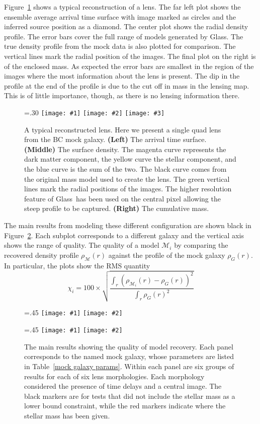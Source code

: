 \documentclass[onecolumn,galley]{mn2e}
\newcommand{\Glass}{{\sc Glass}}
\newcommand{\M}{\ensuremath{\mathscr{M}}}
\newcommand{\tabref}[1] {Table~\ref{#1}}
\newcommand{\figref}[1] {Figure~\ref{#1}}
\newcommand\plottwo[2]{{%
 \centering
 \leavevmode
 \columnwidth=.45\columnwidth
 \texttt{[image: \#1]}%
 \hfil
 \texttt{[image: \#2]}%
}}%
\newcommand\plotthree[3]{{%
 \centering
 \leavevmode
 \columnwidth=.30\columnwidth
 \texttt{[image: \#1]}%
 \hfil
 \texttt{[image: \#2]}%
 \hfil
 \texttt{[image: \#3]}%
}}%
\begin{document}
\figref{reconstruction} shows a typical reconstruction of a
lens. The far left plot shows the ensemble average arrival time surface with
image marked as circles and the inferred source position as a diamond. The
center plot shows the radial density profile. The error bars cover the full
range of models generated by \Glass. The true density profile from the mock
data is also plotted for comparison. The vertical lines mark the radial
position of the images. The final plot on the right is of the enclosed mass. As
expected the error bars are smallest in the region of the images where the most
information about the lens is present. The dip in the profile at the end of the
profile is due to the cut off in mass in the lensing map. This is of little
importance, though, as there is no lensing information there.

\begin{figure}
\plotthree{BCQuadR1a_TmS-a.pdf}{BCQuadR1a_TmS-b.pdf}{BCQuadR1a_TmS-c.pdf}
\caption{A typical reconstructed lens. Here we present a single quad lens from 
the BC mock galaxy.
\textbf{(Left)}
The arrival time surface. 
\textbf{(Middle)}
The surface density. The magenta curve represents the dark matter component,
the yellow curve the stellar component, and the blue curve is the sum of the two.
The black curve comes from the original mass model used to create the lens.
The green vertical lines mark the radial positions of the images. The higher
resolution feature of \Glass\ has been used on the central pixel allowing the
steep profile to be captured.
\textbf{(Right)}
The cumulative mass.}
\label{reconstruction}
\end{figure}

The main results from modeling these different configuration are shown black in
\figref{main results}. Each subplot corresponds to a different galaxy and
the vertical axis shows the range of quality.  The quality of a
model $\M_i$ by comparing the recovered density profile $\rho_\M(r)$ against
the profile of the mock galaxy $\rho_G(r)$.  In particular, the plots show the
RMS quantity
%
\begin{equation}
  \chi_i = 100 \times \sqrt{\frac{\int_r (\rho_{\M_i}(r) - \rho_G(r))^2}{\int_r \rho_G(r)^2}}
\end{equation}
%

\begin{figure}
\plottwo{AAchi2_profile.pdf}{BBchi2_profile.pdf}

\plottwo{ACchi2_profile.pdf}{BCchi2_profile.pdf}
\caption{The main results showing the quality of model recovery. Each panel corresponds to 
the named mock galaxy, whose parameters are listed in \tabref{mock galaxy params}. Within
each panel are six groups of results for each of six lens morphologies. Each morphology
considered the presence of time delays and a central image. The black markers are for tests
that did not include the stellar mass as a lower bound constraint, while the red markers
indicate where the stellar mass has been given.}
\label{main results}
\end{figure}
\end{document}
